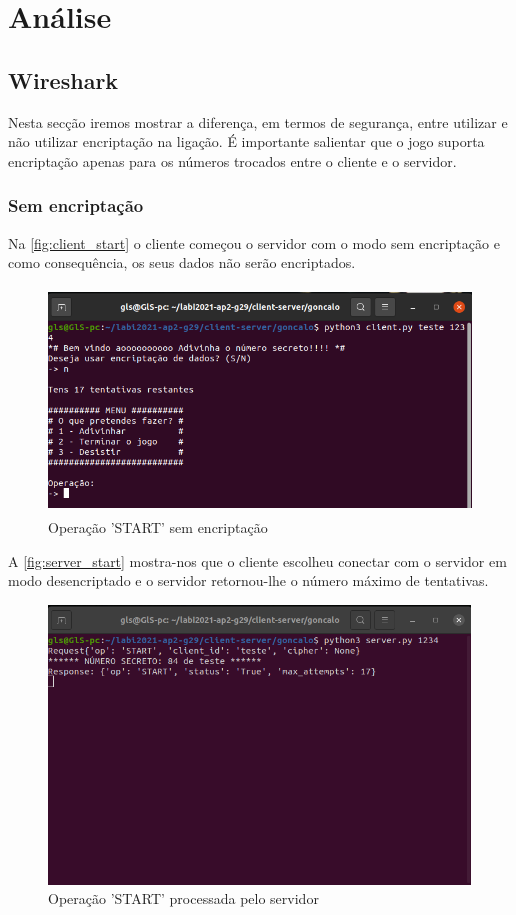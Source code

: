 \documentclass{report}
\begin{document}
\chapter{Análise}
\label{chap.analise}

\section{Wireshark}
\label{sec:wireshark}
Nesta secção iremos mostrar a diferença, em termos de segurança, entre utilizar e não utilizar encriptação na ligação. É importante salientar que o jogo suporta encriptação apenas para os números trocados entre o cliente e o servidor.

\subsection{Sem encriptação}
\label{ssec:wireshark_decrypt}

Na \autoref{fig:client_start} o cliente começou o servidor com o modo sem encriptação e como consequência, os seus dados não serão encriptados.

\begin{figure}[!h]
\center 
\includegraphics[height=170pt]{img/non_encripted/client_start.png}
\caption{Operação 'START' sem encriptação}
\label{fig:client_start}
\end{figure}

A \autoref{fig:server_start} mostra-nos que o cliente escolheu conectar com o servidor em modo desencriptado e o servidor retornou-lhe o número máximo de tentativas.

\begin{figure}[!h]
\center 
\includegraphics[height=210pt]{img/non_encripted/server_start.png}
\caption{Operação 'START' processada pelo servidor}
\label{fig:server_start}
\end{figure}
\end{document}
